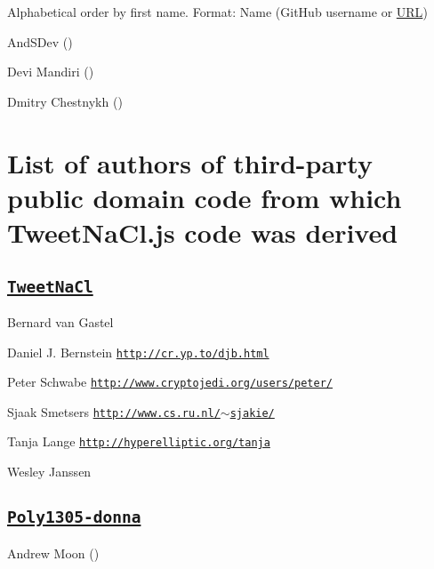Alphabetical order by first name. Format\+: Name (Git\+Hub username or \mbox{\hyperlink{namespace_u_r_l}{U\+RL}})


\begin{DoxyItemize}
\item And\+S\+Dev ()
\item Devi Mandiri ()
\item Dmitry Chestnykh ()
\end{DoxyItemize}

\section*{List of authors of third-\/party public domain code from which Tweet\+Na\+Cl.\+js code was derived }

\subsection*{\href{http://tweetnacl.cr.yp.to/}{\tt Tweet\+Na\+Cl} }


\begin{DoxyItemize}
\item Bernard van Gastel
\item Daniel J. Bernstein \href{http://cr.yp.to/djb.html}{\tt http\+://cr.\+yp.\+to/djb.\+html}
\item Peter Schwabe \href{http://www.cryptojedi.org/users/peter/}{\tt http\+://www.\+cryptojedi.\+org/users/peter/}
\item Sjaak Smetsers \href{http://www.cs.ru.nl/~sjakie/}{\tt http\+://www.\+cs.\+ru.\+nl/$\sim$sjakie/}
\item Tanja Lange \href{http://hyperelliptic.org/tanja}{\tt http\+://hyperelliptic.\+org/tanja}
\item Wesley Janssen
\end{DoxyItemize}

\subsection*{\href{https://github.com/floodyberry/poly1305-donna}{\tt Poly1305-\/donna} }


\begin{DoxyItemize}
\item Andrew Moon () 
\end{DoxyItemize}